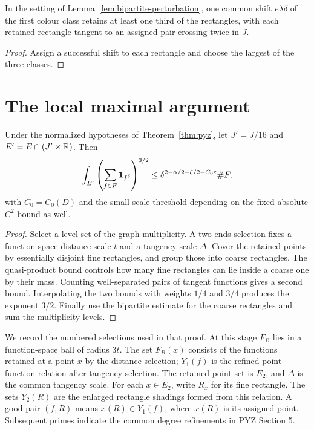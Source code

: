 \begin{corollary}
\label{cor:common-shift}
In the setting of Lemma~\ref{lem:bipartite-perturbation},
one common shift $e\lambda\delta$ of the first colour
class retains at least one third of the rectangles, with
each retained rectangle tangent to an assigned pair
crossing twice in $J$.
\end{corollary}
\begin{proof}
Assign a successful shift to each rectangle and choose
the largest of the three classes.
\end{proof}

\section{The local maximal argument}

\begin{lemma}
\label{lem:pyz-local-maximal}
Under the normalized hypotheses of Theorem~\ref{thm:pyz},
let $J'=J/16$ and $E'=E\cap(J'\times\mathbb{R})$. Then
\[
       \int_{E'}\left(\sum_{f\in F}\mathbf{1}_{f^\delta}\right)^{3/2}
           \leq\delta^{2-\alpha/2-\zeta/2-C_0\varepsilon}\#F,
\]
with $C_0=C_0(D)$ and the small-scale threshold depending
on the fixed absolute $C^2$ bound as well.
\end{lemma}
\begin{proof}
Select a level set of the graph multiplicity. A two-ends
selection fixes a function-space distance scale $t$ and a
tangency scale $\Delta$. Cover the retained points by
essentially disjoint fine rectangles, and group those into
coarse rectangles. The quasi-product bound controls how
many fine rectangles can lie inside a coarse one by their
mass. Counting well-separated pairs of tangent functions
gives a second bound. Interpolating the two bounds with
weights $1/4$ and $3/4$ produces the exponent $3/2$.
Finally use the bipartite estimate for the coarse
rectangles and sum the multiplicity levels.
\end{proof}

We record the numbered selections used in that proof. At
this stage $F_B$ lies in a function-space ball of radius
$3t$. The set $F_B(x)$ consists of the functions retained
at a point $x$ by the distance selection; $Y_1(f)$ is the
refined point-function relation after tangency selection.
The retained point set is $E_2$, and $\Delta$ is the
common tangency scale. For each $x\in E_2$, write $R_x$
for its fine rectangle. The sets $Y_2(R)$ are the
enlarged rectangle shadings formed from this relation.
A good pair $(f,R)$ means $x(R)\in Y_1(f)$, where
$x(R)$ is its assigned point. Subsequent primes indicate
the common degree refinements in PYZ Section 5.

